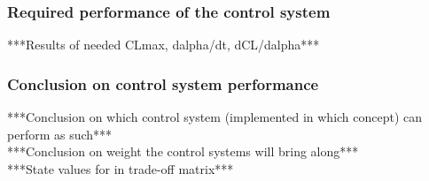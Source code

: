 \subsubsection{Required performance of the control system}
\label{sec:astroperfomance}
***Results of needed CLmax, dalpha/dt, dCL/dalpha***\\

\subsubsection{Conclusion on control system performance}
\label{sec:conclusion}
***Conclusion on which control system (implemented in which concept) can perform as such***\\
***Conclusion on weight the control systems will bring along***\\
***State values for in trade-off matrix***\\
